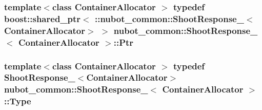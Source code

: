 \hypertarget{structnubot__common_1_1ShootResponse___ad767e21cc82b1273dc15a96d92cf1d99}{
\subsubsection[{Ptr}]{\setlength{\rightskip}{0pt plus 5cm}template$<$class Container\-Allocator $>$ typedef boost\-::shared\-\_\-ptr$<$ \-::{\bf nubot\-\_\-common\-::\-Shoot\-Response\-\_\-}$<$Container\-Allocator$>$ $>$ {\bf nubot\-\_\-common\-::\-Shoot\-Response\-\_\-}$<$ Container\-Allocator $>$\-::{\bf Ptr}}}\label{structnubot__common_1_1ShootResponse___ad767e21cc82b1273dc15a96d92cf1d99}
\hypertarget{structnubot__common_1_1ShootResponse___a1afd972b3b9a5016f438b957fb90c555}{
\subsubsection[{Type}]{\setlength{\rightskip}{0pt plus 5cm}template$<$class Container\-Allocator $>$ typedef {\bf Shoot\-Response\-\_\-}$<$Container\-Allocator$>$ {\bf nubot\-\_\-common\-::\-Shoot\-Response\-\_\-}$<$ Container\-Allocator $>$\-::{\bf Type}}}\label{structnubot__common_1_1ShootResponse___a1afd972b3b9a5016f438b957fb90c555}



